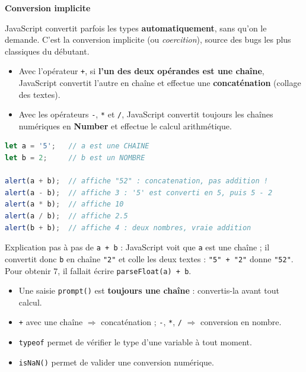 \documentclass[11pt]{article}
\newcommand{\cle}[1]{{\popxbold\color{popdark}#1}}
\begin{document}
\textbf{Conversion implicite}\par

JavaScript convertit parfois les types \textbf{automatiquement}, sans qu'on le demande. C'est la \cle{conversion implicite} (ou \emph{coercition}), source des bugs les plus classiques du débutant.

\begin{propriete}
\begin{itemize}
  \item Avec l'opérateur \texttt{+}, si \textbf{l'un des deux opérandes est une chaîne}, JavaScript convertit l'autre en chaîne et effectue une \textbf{concaténation} (collage des textes).
  \item Avec les opérateurs \texttt{-}, \texttt{*} et \texttt{/}, JavaScript convertit toujours les chaînes numériques en \textbf{Number} et effectue le calcul arithmétique.
\end{itemize}
\end{propriete}

\begin{exemplebox}
\begin{lstlisting}[language=JavaScript]
let a = '5';   // a est une CHAINE
let b = 2;     // b est un NOMBRE

alert(a + b);  // affiche "52" : concatenation, pas addition !
alert(a - b);  // affiche 3 : '5' est converti en 5, puis 5 - 2
alert(a * b);  // affiche 10
alert(a / b);  // affiche 2.5
alert(b + b);  // affiche 4 : deux nombres, vraie addition
\end{lstlisting}
Explication pas à pas de \texttt{a + b} : JavaScript voit que \texttt{a} est une chaîne ; il convertit donc \texttt{b} en chaîne \texttt{"2"} et colle les deux textes : \texttt{"5" + "2"} donne \texttt{"52"}. Pour obtenir $7$, il fallait écrire \texttt{parseFloat(a) + b}.
\end{exemplebox}

\begin{aretenir}
\begin{itemize}
  \item Une saisie \texttt{prompt()} est \textbf{toujours une chaîne} : convertis-la avant tout calcul.
  \item \texttt{+} avec une chaîne $\Rightarrow$ concaténation ; \texttt{-}, \texttt{*}, \texttt{/} $\Rightarrow$ conversion en nombre.
  \item \texttt{typeof} permet de vérifier le type d'une variable à tout moment.
  \item \texttt{isNaN()} permet de valider une conversion numérique.
\end{itemize}
\end{aretenir}
\end{document}
